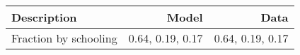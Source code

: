 \begin{tabular}{lrr}
\hline
Description & Model  & Data  \\
\hline
Fraction by schooling & 0.64, 0.19, 0.17  & 0.64, 0.19, 0.17  \\
\hline
\end{tabular}%
